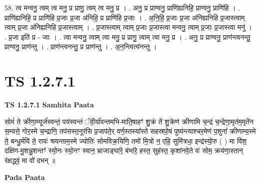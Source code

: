 \documentclass[17pt]{extarticle}
\begin{document}
58. त्व मन्वनु॒ त्वम् त्व मनु॒ प्र प्राणु॒ त्वम् त्व मनु॒ प्र । . अनु॒ प्र प्राण्वनु॒ प्राणि॑ह्यनिहि॒ प्राण्वनु॒ प्राणि॑हि । . प्राणि॑ह्यनिहि॒ प्र प्राणि॑हि प्र॒जाः प्र॒जा अ॑निहि॒ प्र प्राणि॑हि प्र॒जाः । . अ॒नि॒हि॒ प्र॒जाः प्र॒जा अ॑निह्यनिहि प्र॒जास्त्वाम् त्वाम् प्र॒जा अ॑निह्यनिहि प्र॒जास्त्वाम् । . प्र॒जास्त्वाम् त्वाम् प्र॒जाः प्र॒जास्त्वा मन्वनु॒ त्वाम् प्र॒जाः प्र॒जास्त्वा मनु॑ । . प्र॒जा इति॑ प्र - जाः । . त्वा मन्वनु॒ त्वाम् त्वा मनु॒ प्र प्राणु॒ त्वाम् त्वा मनु॒ प्र । . अनु॒ प्र प्राण्वनु॒ प्राण॑न्त्वनन्तु॒ प्राण्वनु॒ प्राण॑न्तु । . प्राण॑न्त्वनन्तु॒ प्र प्राण॑न्तु । . अ॒न॒न्त्वित्य॑नन्तु । \newline
\pagebreak
{}

\section{ TS 1.2.7.1 }

\textbf{TS 1.2.7.1 } \newline
\textbf{Samhita Paata} \newline

सोमं॑ ते क्रीणा॒म्यूर्ज॑स्वन्तं॒ पय॑स्वन्तं ॅवी॒र्या॑वन्तमभि-माति॒षाहꣳ॑ शु॒क्रं ते॑ शु॒क्रेण॑ क्रीणामि च॒न्द्रं च॒न्द्रेणा॒मृत॑म॒मृते॑न स॒म्यत्ते॒ गोर॒स्मे च॒न्द्राणि॒ तप॑सस्त॒नूर॑सि प्र॒जाप॑ते॒र् वर्ण॒स्तस्या᳚स्ते सहस्रपो॒षं पुष्य॑न्त्याश्चर॒मेण॑ प॒शुना᳚ क्रीणाम्य॒स्मे ते॒ बन्धु॒र्मयि॑ ते॒ रायः॑ श्रयन्ताम॒स्मे ज्योतिः॑ सोमविक्र॒यिणि॒ तमो॑ मि॒त्रो न॒ एहि॒ सुमि॑त्रधा॒ इन्द्र॑स्यो॒रु ( ) मा वि॑श॒ दक्षि॑ण-मु॒शन्नु॒शन्तꣳ॑ स्यो॒नः स्यो॒नꣳ स्वान॒ भ्राजाङ्घा॑रे॒ बंभा॑रे॒ हस्त॒ सुह॑स्त॒ कृशा॑नवे॒ते वः॑ सोम॒ क्रय॑णा॒स्तान् र॑क्षद्ध्वं॒ मा वो॑ दभन् ॥ \newline

\textbf{Pada Paata} \newline
\end{document}
